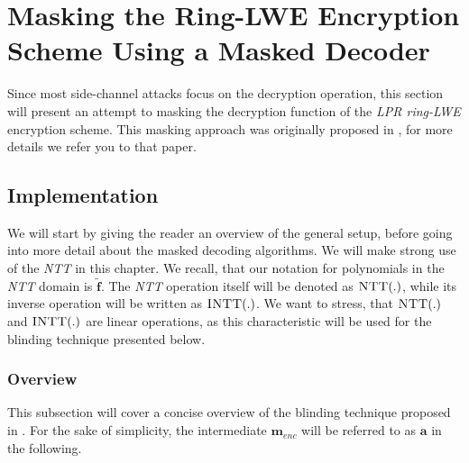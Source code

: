 \chapter{Masking the Ring-LWE Encryption Scheme Using a Masked Decoder}
Since most side-channel attacks focus on the decryption operation, this section will present an attempt to masking the decryption function of the \textit{\ac{LPR} \ac{ring-LWE}} encryption scheme. This masking approach was originally proposed in \cite{maskedRing}, for more details we refer you to that paper.

\section{Implementation}
We will start by giving the reader an overview of the general setup, before going into more detail about the masked decoding algorithms. We will make strong use of the \textit{\ac{NTT}} in this chapter. We recall, that our notation for polynomials in the \textit{\ac{NTT}} domain is \(\tilde{\textbf{f}}\). The \textit{\ac{NTT}} operation itself will be denoted as \(\textsc{NTT}(.)\), while its inverse operation will be written as \(\textsc{INTT}(.)\). We want to stress, that \(\textsc{NTT}(.)\) and \(\textsc{INTT}(.)\) are linear operations, as this characteristic will be used for the blinding technique presented below.

\subsection{Overview}
This subsection will cover a concise overview of the blinding technique proposed in \cite{maskedRing}. For the sake of simplicity, the intermediate \(\textbf{m}_{enc}\) will be referred to as \(\textbf{a}\) in the following.

